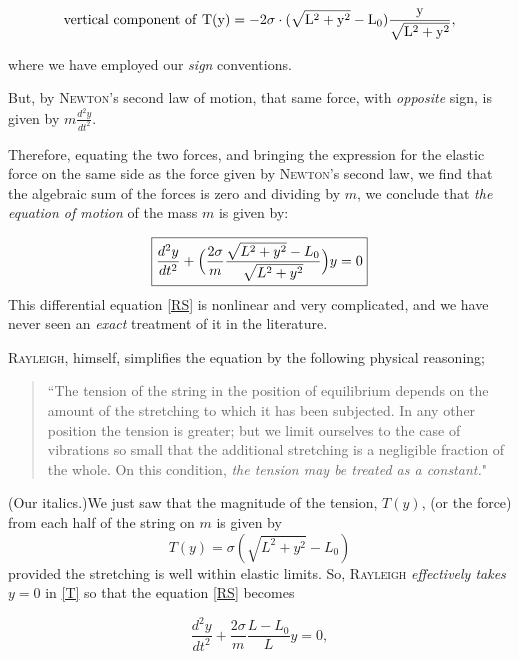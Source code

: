 \documentclass[12pt]{article}
\numberwithin{equation}{section}
\begin{document}
\begin{equation}
\label{ }
\rm{vertical \  component \  of \  T(y)}=-2\sigma\cdot (\sqrt{L^2+y^2}-L_0)\frac{y}{\sqrt{L^2+y^2}},
\end{equation}

\noindent where we have employed our \emph{sign} conventions.

But, by \textsc{Newton}'s second law of motion, that same force, with \emph{opposite} sign, is given by $m\frac{d^2y}{dt^2}$. 



Therefore, equating the two forces, and bringing the expression for the elastic force on the same side as the force given by \textsc{Newton}'s second law, we find that the algebraic sum of the forces is zero and dividing by $m$, we conclude that  \emph{the equation of motion} of the mass $m$ is given by:

\begin{equation}
\label{RS}
\boxed{\frac{d^2y}{dt^2}+\Bigl(\frac{2\sigma}{m}\frac{\sqrt{L^2+y^2}-L_0}{\sqrt{L^2+y^2}}\Bigr)y=0}
\end{equation}
This differential equation \eqref{RS} is nonlinear and very complicated, and we have never seen an \emph{exact} treatment of it in the literature.

\textsc{Rayleigh}, himself, simplifies the equation by the following physical reasoning;

\begin{quotation}``The tension of the string in the position of equilibrium depends on the amount of the stretching to which it has been subjected.  In any other position the tension is greater; but we limit ourselves to the case of vibrations so small that the additional stretching is a negligible fraction of the whole.  On this condition, \emph{the tension may be treated as a constant.}"\end{quotation}

(Our italics.)We just saw that the magnitude of the tension, $T(y)$, (or the force) from each half of the string on $m$ is given by
\begin{equation}
\label{T}
T(y)=\sigma(\sqrt{L^2+y^2}-L_0)
\end{equation}provided the stretching is well within elastic limits.  So, \textsc{Rayleigh} \emph{effectively takes }$y=0$ in \eqref{T} so that the equation \eqref{RS} becomes

\begin{equation}
\label{LRS}
\frac{d^2y}{dt^2}+\frac{2\sigma}{m}\frac{L-L_0}{L}y=0,
\end{equation} 
\end{document}
